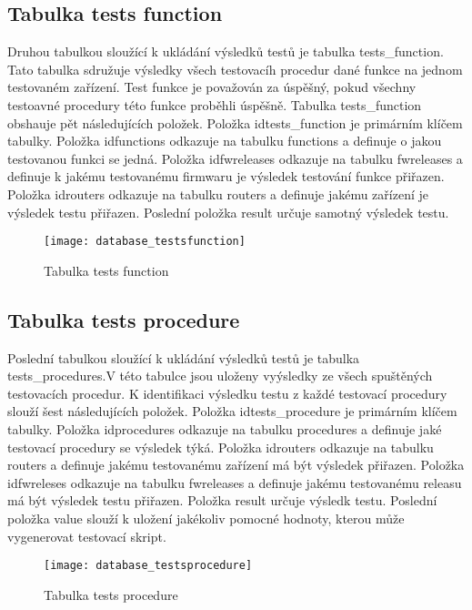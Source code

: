 \subsection{Tabulka tests function}
Druhou tabulkou sloužící k ukládání výsledků testů je tabulka tests\_function. Tato tabulka sdružuje výsledky všech testovacíh procedur dané funkce na jednom testovaném zařízení. Test funkce je považován za úspěšný, pokud všechny testoavné procedury této funkce proběhli úspěšně. Tabulka tests\_function obshauje pět následujících položek. Položka idtests\_function je primárním klíčem tabulky. Položka idfunctions odkazuje na tabulku functions a definuje o jakou testovanou funkci se jedná. Položka idfwreleases odkazuje na tabulku fwreleases a definuje k jakému testovanému firmwaru je výsledek testování funkce přiřazen. Položka idrouters odkazuje na tabulku routers a definuje jakému zařízení je výsledek testu přiřazen. Poslední položka result určuje samotný výsledek testu.

\begin{figure}[h]
  \centering
  \texttt{[image: database\_testsfunction]}
  \caption{Tabulka tests function}
  \label{fig:database_testsfunction}
\end{figure}

\subsection{Tabulka tests procedure}
Poslední tabulkou sloužící k ukládání výsledků testů je tabulka tests\_procedures.V této tabulce jsou uloženy vyýsledky ze všech spuštěných testovacích procedur. K identifikaci výsledku testu z každé testovací procedury slouží šest následujících položek. Položka idtests\_procedure je primárním klíčem tabulky. Položka idprocedures odkazuje na tabulku procedures a definuje jaké testovací procedury se výsledek týká. Položka idrouters odkazuje na tabulku routers a definuje jakému testovanému zařízení má být výsledek přiřazen. Položka idfwreleses odkazuje na tabulku fwreleases a definuje jakému testovanému releasu má být výsledek testu přiřazen. Položka result určuje výsledk testu. Poslední položka value slouží k uložení jakékoliv pomocné hodnoty, kterou může vygenerovat testovací skript.

\begin{figure}[h]
  \centering
  \texttt{[image: database\_testsprocedure]}
  \caption{Tabulka tests procedure}
  \label{fig:database_testsprocedure}
\end{figure}

